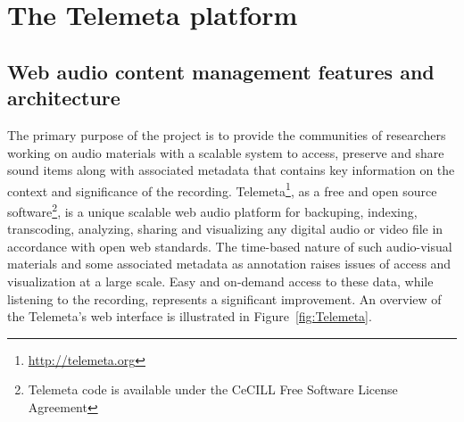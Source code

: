\documentclass{sig-alternate}
\begin{document}
 
 \section{The Telemeta platform}\label{sec:Telemeta}
 \subsection{Web audio content management features and architecture}
The primary purpose of the project is to provide the communities of researchers working on audio materials with a scalable system to access, preserve and share sound items along with associated metadata that contains key information on the context and significance of the recording.
Tele\-meta\footnote{\url{http://telemeta.org}}, as a free and open source software\footnote{Telemeta code is available under the CeCILL Free Software License Agreement}, is a unique scalable web audio platform for backuping, indexing, transcoding, analyzing, sharing and visualizing any digital audio or video file in accordance with open web standards.
The time-based nature of such audio-visual materials and some associated metadata as annotation raises issues of access and visualization at a large scale. Easy and on-demand access to these data, while listening to the recording, represents a significant improvement.
An overview of the Telemeta's web interface is illustrated in Figure~\ref{fig:Telemeta}.
\end{document}
